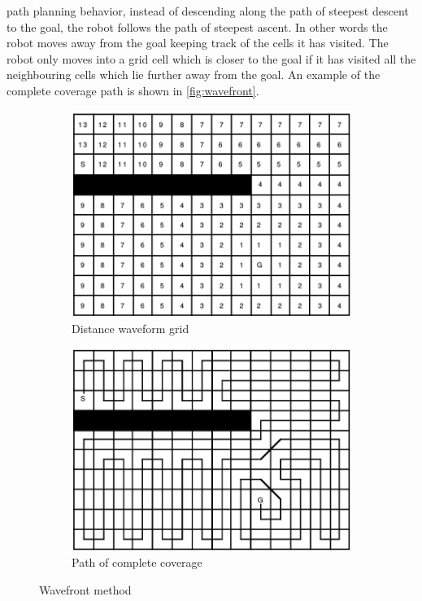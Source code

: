 path planning behavior, instead of descending along the path of steepest descent to the goal, the robot follows the
path of steepest ascent. In other words the robot moves away from the goal keeping track of the cells it has visited. The robot only moves into a grid cell which is closer to the goal if it has visited all the neighbouring cells which lie further away from the goal. An example of the complete coverage path is shown in \autoref{fig:wavefront}.
\begin{figure}[ht]
\centering
\begin{subfigure}{.5\textwidth}
  \centering
  \includegraphics[width=.9\linewidth]{figures/C3/wavefrontGrid.png}
  \caption{Distance waveform grid}
\end{subfigure}%
\begin{subfigure}{.5\textwidth}
  \centering
  \includegraphics[width=.9\linewidth]{figures/C3/wavefrontCPath.png}
  \caption{Path of complete coverage}
\end{subfigure}
\caption{Wavefront method \cite{Zelinsky93planningpaths}}
\label{fig:wavefront}
\end{figure}
